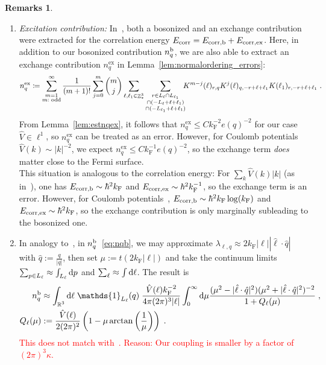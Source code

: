 \documentclass[12pt,a4paper]{article}
\numberwithin{equation}{section}
\newcommand{\1}{\mathbb{I}}
\renewcommand{\b}{\textnormal{b}}
\newcommand{\corr}{\textnormal{corr}}
\newcommand{\di}{\textnormal{d}}
\newcommand{\ex}{\mathrm{ex}}
\newcommand{\F}{\mathrm{F}}
\DeclareMathOperator{\R}{\mathbb{R}}
\DeclareMathOperator{\Z}{\mathbb{Z}}
\theoremstyle{plain}
\theoremstyle{definition}
\newtheorem*{remarks}{Remarks}
\theoremstyle{remark}
\theoremstyle{plain}
\theoremstyle{definition}
\theoremstyle{remark}
\begin{document}
\begin{remarks}
\begin{enumerate}
\item \textit{Excitation contribution:} In~\cite{CHN23,CHN24}, both a bosonized and an exchange contribution were extracted for the correlation energy $ E_{\corr} = E_{\corr,\b} + E_{\corr,\ex} $. Here, in addition to our bosonized contribution $ n_q^{\b} $, we are also able to extract an exchange contribution $ n_q^{\ex} $ in Lemma~\ref{lem:normalordering_errors}:
\begin{equation} \label{eq:nqex}
	n_q^{\ex}
	\coloneq \sum_{\substack{m=1\\m:\textnormal{ odd}}}^\infty \frac{1}{(m+1)!} \sum_{j=0}^m {{m} \choose {j}}
		\sum\limits_{\ell,\ell_1 \in \Z^3_*}\sum\limits_{\substack{r\in L_{\ell} \cap L_{\ell_1}\\ \cap (-L_{\ell}+\ell+\ell_1) \\ \cap (-L_{\ell_1}+\ell+\ell_1 )}} \!\!\!
		K^{m-j}(\ell)_{r,q}
		K^j(\ell)_{q,-r+\ell+\ell_1}
		K(\ell_1)_{r,-r+\ell+\ell_1} \;.
\end{equation}
From Lemma~\ref{lem:estnqex}, it follows that $ n_q^{\ex} \le C k_{\F}^{-2} e(q)^{-2} $ for our case $ \hat{V} \in \ell^1 $, so $ n_q^{\ex} $ can be treated as an error. However, for Coulomb potentials $ \hat{V}(k) \sim |k|^{-2} $, we expect $ n_q^{\ex} \le C k_{\F}^{-1} e(q)^{-2} $, so the exchange term \emph{does} matter close to the Fermi surface.\\
This situation is analogous to the correlation energy: For $ \sum_k \hat{V}(k) |k| $ (as in~\cite{CHN21}), one has $ E_{\corr,\b} \sim \hbar^2 k_{\F} $ and $ E_{\corr,\ex} \sim \hbar^2 k_{\F}^{-1} $, so the exchange term is an error. However, for Coulomb potentials~\cite{CHN23,CHN24}, $ E_{\corr,\b} \sim \hbar^2 k_{\F} \log(k_{\F}) $ and $ E_{\corr,\ex} \sim \hbar^2 k_{\F} $, so the exchange contribution is only marginally subleading to the bosonized one.


\item In analogy to~\cite[Sect.~1.1]{BL25}, in $ n_q^{\b} $~\eqref{eq:nqb}, we may approximate $ \lambda_{\ell,q} \approx 2 k_{\F} |\ell| |\hat{\ell} \cdot \hat{q}| $ with $ \hat{q} := \frac{q}{|q|} $, then set $ \mu := t (2 k_{\F} |\ell|) $ and take the continuum limits $ \sum_{p \in L_\ell} \approx \int_{L_\ell} \di p $ and $ \sum_\ell \approx \int \di \ell $. The result is 
\begin{equation}
\begin{aligned}
	n_q^{\b}
	&\approx \int_{\R^3} \di \ell \; \mathds{1}_{L_{\ell}}(q) \; \frac{\hat{V}(\ell) k_{\F}^{-2}}{4 \pi (2 \pi)^3 |\ell|}
		\int_0^\infty \di \mu \frac{(\mu^2-|\hat{\ell} \cdot \hat{q}|^2) (\mu^2 + |\hat{\ell} \cdot \hat{q}|^2)^{-2}}{1 + Q_\ell(\mu)} \;, \\
	Q_\ell(\mu) &:= \frac{\hat{V}(\ell)}{2 (2 \pi)^2} \left( 1 - \mu \arctan \left( \frac{1}{\mu} \right) \right) \;.
\end{aligned}
\end{equation}
\textcolor{red}{This does not match with~\cite{BL25}. Reason: Our coupling is smaller by a factor of $ (2 \pi)^3 \kappa $.}

\end{enumerate}
\end{remarks}
\end{document}
